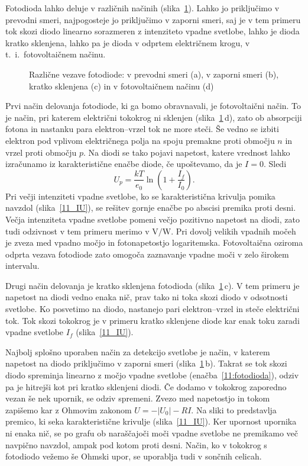 Fotodioda lahko deluje v različnih načinih (slika~\ref{11_PD}). 
Lahko jo priključimo v prevodni smeri,
najpogosteje jo priključimo v zaporni smeri, saj je v
tem primeru tok skozi diodo linearno sorazmeren z intenziteto vpadne svetlobe, lahko 
je dioda kratko sklenjena, lahko pa je dioda v odprtem električnem krogu, v t.\ i.\ fotovoltaičnem 
načinu. 
\begin{figure}[h]
\centering
\def\svgwidth{130truemm} 

\caption{Različne vezave fotodiode: v prevodni smeri (a), v zaporni smeri (b), kratko sklenjena (c) in 
v fotovoltaičnem načinu (d)}
\label{11_PD}
\end{figure}

Prvi način delovanja fotodiode, ki ga bomo obravnavali, je fotovoltaični način.
To je način, pri katerem električni tokokrog ni sklenjen (slika~\ref{11_PD}\,d), 
zato ob absorpciji fotona in nastanku para elektron--vrzel tok ne more steči. 
Še vedno se izbiti elektron pod vplivom električnega polja
na spoju premakne proti območju $n$ in vrzel proti območju $p$.
Na diodi se tako pojavi napetost, 
katere vrednost lahko izračunamo iz karakteristične enačbe diode, če upoštevamo, da je $I=0$. Sledi
\begin{equation}
U_p = \frac{kT}{e_0}\ln \left(1+ \frac{I_f}{I_0}\right).
\end{equation}
Pri večji intenziteti vpadne svetlobe, ko se karakteristična krivulja 
pomika navzdol (slika~\ref{11_IU}), se rešitev gornje enačbe po abscisi premika proti desni.
Večja intenziteta vpadne svetlobe pomeni večjo 
pozitivno napetost na diodi, zato tudi odzivnost v tem primeru merimo v $\si{\volt}/\si{\watt}$.
Pri dovolj velikih vpadnih močeh je zveza med vpadno močjo in fotonapetostjo
logaritemska. Fotovoltaična oziroma odprta vezava fotodiode zato omogoča 
zaznavanje vpadne moči v zelo širokem intervalu. 

Drugi način delovanja je kratko sklenjena fotodioda (slika~\ref{11_PD}\,c).
V tem primeru je  napetost na diodi 
vedno enaka nič, prav tako ni toka skozi diodo v odsotnosti svetlobe. 
Ko posvetimo na diodo, nastanejo pari elektron--vrzel in steče električni tok.
Tok skozi tokokrog je v primeru kratko sklenjene diode kar enak toku 
zaradi vpadne svetlobe $I_f$ (slika~\ref{11_IU}).

Najbolj splošno uporaben način za detekcijo svetlobe je način, v katerem 
napetost na diodo priključimo v zaporni smeri (slika~\ref{11_PD}\,b).
Takrat se tok skozi diodo spreminja linearno z močjo vpadne svetlobe
(enačba~\ref{11:fotodioda}), odziv pa je hitrejši
kot pri kratko sklenjeni diodi. Če dodamo v tokokrog zaporedno vezan še nek upornik, se odziv
spremeni. Zvezo med napetostjo in tokom zapišemo kar z Ohmovim zakonom $U = -|U_0|-RI$. 
Na sliki to predstavlja premico, ki seka karakteristične krivulje (slika~\ref{11_IU}). Ker upornost
upornika ni enaka nič, se po grafu ob naraščajoči moči vpadne svetlobe ne premikamo več navpično navzdol, 
ampak pod kotom proti desni. Način, ko v tokokrog s fotodiodo vežemo še Ohmski upor,
se uporablja tudi v sončnih celicah. 

